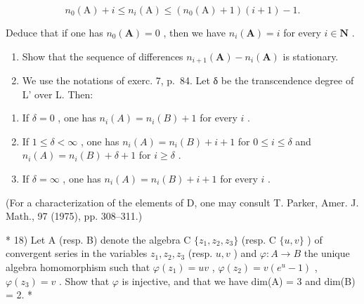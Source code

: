 \[
n _ {0} (\mathrm{A}) + i \leqslant n _ {i} (\mathrm{A}) \leqslant (n _ {0} (\mathrm{A}) + 1) (i + 1) - 1.
\]

Deduce that if one has \(n_0(\mathbf{A}) = 0\) , then we have \(n_i(\mathbf{A}) = i\) for every \(i \in \mathbf{N}\) .

\begin{enumerate}
\def\labelenumi{\alph{enumi})}
\setcounter{enumi}{3}
\item
  Show that the sequence of differences \(n_{i+1}(\mathbf{A}) - n_i(\mathbf{A})\) is stationary.
\item
  We use the notations of exerc. 7, p.~84. Let δ be the transcendence degree of L' over L. Then:
\end{enumerate}

\begin{enumerate}
\def\labelenumi{(\roman{enumi})}
\item
  If \(\delta = 0\) , one has \(n_i(A) = n_i(B) + 1\) for every \(i\) .
\item
  If \(1 \leqslant \delta < \infty\) , one has \(n_i(A) = n_i(B) + i + 1\) for \(0 \leqslant i \leqslant \delta\) and \(n_i(A) = n_i(B) + \delta + 1\) for \(i \geqslant \delta\) .
\item
  If \(\delta = \infty\) , one has \(n_i(A) = n_i(B) + i + 1\) for every \(i\) .
\end{enumerate}

(For a characterization of the elements of D, one may consult T. Parker, Amer. J. Math., 97 (1975), pp. 308–311.)

* 18) Let A (resp. B) denote the algebra C \(\{z_{1}, z_{2}, z_{3}\}\) (resp. C \(\{u, v\}\) ) of convergent series in the variables \(z_{1}, z_{2}, z_{3}\) (resp. \(u, v\) ) and \(\varphi: A \to B\) the unique algebra homomorphism such that \(\varphi(z_{1}) = uv\) , \(\varphi(z_{2}) = v(e^{u} - 1)\) , \(\varphi(z_{3}) = v\) . Show that \(\varphi\) is injective, and that we have dim(A) = 3 and dim(B) = 2. *

